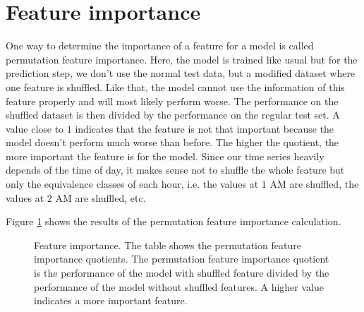 \section{Feature importance}
\label{sec:feature-importance}

One way to determine the importance of a feature for a model is called 
permutation feature importance. Here, the model is trained like usual but for the prediction 
step, we don't use the normal test data, but a modified dataset where one feature is 
shuffled. Like that, the model cannot use the information of this feature properly 
and will most likely perform worse. The performance on the shuffled dataset is 
then divided by the performance on the regular test set. A value close to \(1\) 
indicates that the feature is not that important because the model doesn't perform 
much worse than before. The higher the quotient, the more important the feature is for the model.
Since our time series heavily depends of the time of day, it makes sense 
not to shuffle the whole feature but only the equivalence classes of each hour, 
i.e. the values at \(1\) AM are shuffled, the values at \(2\) AM are shuffled, etc.

Figure \ref{fig:feature-importance} 
shows the results of the permutation feature importance calculation.

\begin{figure}[h!]
    
    \caption[Feature importance]{Feature importance. 
    The table shows the permutation feature importance quotients. 
    The permutation feature importance quotient is 
    the performance of the model with shuffled feature 
    divided by the performance of the model without shuffled features. 
    A higher value indicates a more important feature.}
    \label{fig:feature-importance}
\end{figure}